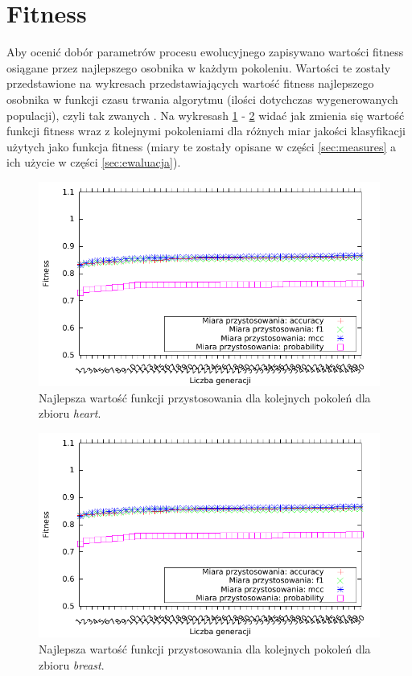 \FloatBarrier
\section{Fitness}
Aby ocenić dobór parametrów procesu ewolucyjnego zapisywano wartości fitness osiągane przez najlepszego osobnika w każdym pokoleniu. Wartości te zostały przedstawione na wykresach przedstawiających wartość fitness najlepszego osobnika w funkcji czasu trwania algorytmu (ilości dotychczas wygenerowanych populacji), czyli tak zwanych . Na wykresash \ref{fig:fit-heart} - \ref{fig:fit-breast} widać jak zmienia się wartość funkcji fitness wraz z kolejnymi pokoleniami dla różnych miar jakości klasyfikacji użytych jako funkcja fitness (miary te zostały opisane w części \ref{sec:measures} a ich użycie w części \ref{sec:ewaluacja}).

	\begin{figure}
		\includegraphics[scale=0.90]{figures/results/fitness/fitness-heart}
		\caption{Najlepsza wartość funkcji przystosowania dla kolejnych pokoleń dla zbioru \emph{heart}.\label{fig:fit-heart}}
	\end{figure}
	
	\begin{figure}
		\includegraphics[scale=0.90]{figures/results/fitness/fitness-breast}
		\caption{Najlepsza wartość funkcji przystosowania dla kolejnych pokoleń dla zbioru \emph{breast}.\label{fig:fit-breast}}
	\end{figure}	
	
